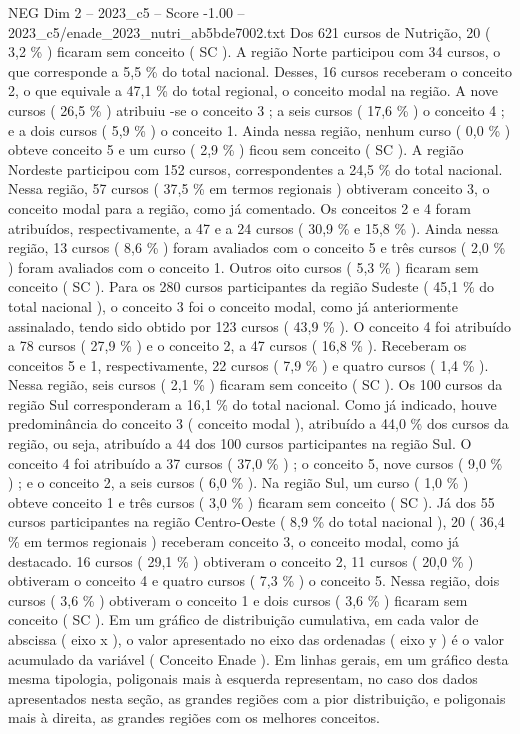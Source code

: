 \begin{textsample}{NEG Dim 2 – 2023\_c5 – Score -1.00 – 2023\_c5/enade\_2023\_nutri\_ab5bde7002.txt}
Dos 621 cursos de Nutrição, 20 ( 3,2 \% ) ficaram sem conceito ( SC ).
A região Norte participou com 34 cursos, o que corresponde a 5,5 \% do total nacional.
Desses, 16 cursos receberam o conceito 2, o que equivale a 47,1 \% do total regional, o conceito modal na região.
A nove cursos ( 26,5 \% ) atribuiu -se o conceito 3 ; a seis cursos ( 17,6 \% ) o conceito 4 ; e a dois cursos ( 5,9 \% ) o conceito 1.
Ainda nessa região, nenhum curso ( 0,0 \% ) obteve conceito 5 e um curso ( 2,9 \% ) ficou sem conceito ( SC ).
A região Nordeste participou com 152 cursos, correspondentes a 24,5 \% do total nacional.
Nessa região, 57 cursos ( 37,5 \% em termos regionais ) obtiveram conceito 3, o conceito modal para a região, como já comentado.
Os conceitos 2 e 4 foram atribuídos, respectivamente, a 47 e a 24 cursos ( 30,9 \% e 15,8 \% ).
Ainda nessa região, 13 cursos ( 8,6 \% ) foram avaliados com o conceito 5 e três cursos ( 2,0 \% ) foram avaliados com o conceito 1.
Outros oito cursos ( 5,3 \% ) ficaram sem conceito ( SC ).
Para os 280 cursos participantes da região Sudeste ( 45,1 \% do total nacional ), o conceito 3 foi o conceito modal, como já anteriormente assinalado, tendo sido obtido por 123 cursos ( 43,9 \% ).
O conceito 4 foi atribuído a 78 cursos ( 27,9 \% ) e o conceito 2, a 47 cursos ( 16,8 \% ).
Receberam os conceitos 5 e 1, respectivamente, 22 cursos ( 7,9 \% ) e quatro cursos ( 1,4 \% ).
Nessa região, seis cursos ( 2,1 \% ) ficaram sem conceito ( SC ).
Os 100 cursos da região Sul corresponderam a 16,1 \% do total nacional.
Como já indicado, houve predominância do conceito 3 ( conceito modal ), atribuído a 44,0 \% dos cursos da região, ou seja, atribuído a 44 dos 100 cursos participantes na região Sul.
O conceito 4 foi atribuído a 37 cursos ( 37,0 \% ) ; o conceito 5, nove cursos ( 9,0 \% ) ; e o conceito 2, a seis cursos ( 6,0 \% ).
Na região Sul, um curso ( 1,0 \% ) obteve conceito 1 e três cursos ( 3,0 \% ) ficaram sem conceito ( SC ).
Já dos 55 cursos participantes na região Centro-Oeste ( 8,9 \% do total nacional ), 20 ( 36,4 \% em termos regionais ) receberam conceito 3, o conceito modal, como já destacado. 16 cursos ( 29,1 \% ) obtiveram o conceito 2, 11 cursos ( 20,0 \% ) obtiveram o conceito 4 e quatro cursos ( 7,3 \% ) o conceito 5.
Nessa região, dois cursos ( 3,6 \% ) obtiveram o conceito 1 e dois cursos ( 3,6 \% ) ficaram sem conceito ( SC ).
Em um gráfico de distribuição cumulativa, em cada valor de abscissa ( eixo x ), o valor apresentado no eixo das ordenadas ( eixo y ) é o valor acumulado da variável ( Conceito Enade ).
Em linhas gerais, em um gráfico desta mesma tipologia, poligonais mais à esquerda representam, no caso dos dados apresentados nesta seção, as grandes regiões com a pior distribuição, e poligonais mais à direita, as grandes regiões com os melhores conceitos.

\end{textsample}
